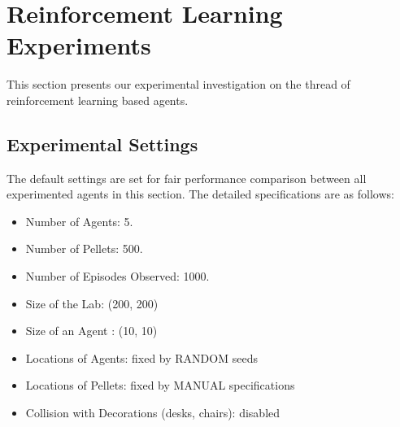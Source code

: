 \documentclass[conference]{IEEEtran}
\begin{document}
%
%
%

\section{Reinforcement Learning Experiments}
\label{section:rlexpo} 

This section presents our experimental investigation on the thread of reinforcement
learning based agents.

\subsection{Experimental Settings}
The default settings are set for fair performance comparison between all
experimented agents in this section. The detailed specifications are as follows:
\begin{itemize}
    \item Number of Agents: 5.
    \item Number of Pellets: 500. 
    \item Number of Episodes Observed: 1000. 
    \item Size of the Lab: (200, 200)
    \item Size of an Agent : (10, 10)
    \item Locations of Agents: fixed by RANDOM seeds
    \item Locations of Pellets: fixed by MANUAL specifications
    \item Collision with Decorations (desks, chairs): disabled
\end{itemize}
\end{document}
